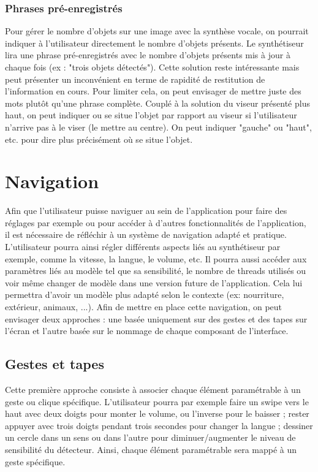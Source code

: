 \documentclass[UTF8]{EPURapport}
\begin{document}
\subsubsection{Phrases pré-enregistrés}
Pour gérer le nombre d'objets sur une image avec la synthèse vocale, on pourrait indiquer à l'utilisateur directement le nombre d'objets présents. Le synthétiseur lira une phrase pré-enregistrés avec le nombre d'objets présents mis à jour à chaque fois (ex : "trois objets détectés"). Cette solution reste intéressante mais peut présenter un inconvénient en terme de rapidité de restitution de l'information en cours. Pour limiter cela, on peut envisager de mettre juste des mots plutôt qu'une phrase complète. Couplé à la solution du viseur présenté plus haut, on peut indiquer ou se situe l'objet par rapport au viseur si l'utilisateur n'arrive pas à le viser (le mettre au centre). On peut indiquer "gauche" ou "haut", etc. pour dire plus précisément où se situe l'objet.

\section{Navigation}
Afin que l'utilisateur puisse naviguer au sein de l'application pour faire des réglages par exemple ou pour accéder à d'autres fonctionnalités de l'application, il est nécessaire de réfléchir à un système de navigation adapté et pratique. L'utilisateur pourra ainsi régler différents aspects liés au synthétiseur par exemple, comme la vitesse, la langue, le volume, etc. Il pourra aussi accéder aux paramètres liés au modèle tel que sa sensibilité, le nombre de threads utilisés ou voir même changer de modèle dans une version future de l'application. Cela lui permettra d'avoir un modèle plus adapté selon le contexte (ex: nourriture, extérieur, animaux, ...). Afin de mettre en place cette navigation, on peut envisager deux approches : une basée uniquement sur des gestes et des tapes sur l'écran et l'autre basée sur le nommage de chaque composant de l'interface.

\subsection{Gestes et tapes}
Cette première approche consiste à associer chaque élément paramétrable à un geste ou clique spécifique. L'utilisateur pourra par exemple faire un swipe vers le haut avec deux doigts pour monter le volume, ou l'inverse pour le baisser ; rester appuyer avec trois doigts pendant trois secondes pour changer la langue ; dessiner un cercle dans un sens ou dans l'autre pour diminuer/augmenter le niveau de sensibilité du détecteur. Ainsi, chaque élément paramétrable sera mappé à un geste spécifique.\
\end{document}
